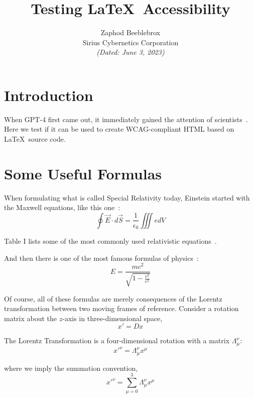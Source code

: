 \documentclass[10pt,twocolumn]{article}
\begin{document}
\title{Testing \LaTeX\ Accessibility}
\author{Zaphod Beeblebrox \\
Sirius Cybernetics Corporation \\
\textit{(Dated: June 3, 2023)}}
\date{}

\maketitle

\section{Introduction}

When GPT-4 first came out, it immediately gained the attention of scientists~\cite{ref1}. Here we test if it can be used to create WCAG-compliant HTML based on \LaTeX\ source code.

\section{Some Useful Formulas}

When formulating what is called Special Relativity today, Einstein started with the Maxwell equations, like this one~\cite{ref3}:
\begin{equation}
\oint \vec{E} \cdot d\vec{S} = \frac{1}{\epsilon_0} \iiint edV
\end{equation}

Table I lists some of the most commonly used relativistic equations~\cite{ref3}.

And then there is one of the most famous formulas of physics~\cite{ref4}:
\begin{equation}
E = \frac{mc^2}{\sqrt{1 - \frac{v^2}{c^2}}}
\end{equation}

Of course, all of these formulas are merely consequences of the Lorentz transformation between two moving frames of reference. Consider a rotation matrix about the $z$-axis in three-dimensional space,
\begin{equation}
x' = Dx
\end{equation}

The Lorentz Transformation is a four-dimensional rotation with a matrix $\Lambda^\nu_\mu$:
\begin{equation}
x'^\nu = \Lambda^\nu_\mu x^\mu
\end{equation}

where we imply the summation convention,
\begin{equation}
x'^\nu = \sum_{\mu=0}^3 \Lambda^\nu_\mu x^\mu
\end{equation}
\end{document}

